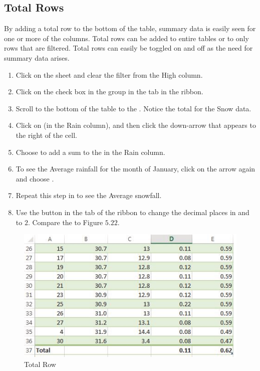 \subsection{Total Rows}

By adding a total row to the bottom of the table, summary data is easily seen for one or more of the columns. Total rows can be added to entire tables or to only rows that are filtered. Total rows can easily be toggled on and off as the need for summary data arises.

\begin{enumerate}
	\item Click on the  sheet and clear the filter from the High column.
	\item Click on the  check box in the  group in the  tab in the ribbon.
	\item Scroll to the bottom of the table to the . Notice the total for the Snow data.
	\item Click on  (in the Rain column), and then click the down-arrow that appears to the right of the cell.
	\item Choose  to add a sum to the  in the Rain column.
	\item To see the Average rainfall for the month of January, click on the arrow again and choose .
	\item Repeat this step in  to see the Average snowfall.
	\item Use the  button in the  tab of the ribbon to change the decimal places in  and  to $ 2 $. Compare the  to Figure $ 5.22 $.
\end{enumerate}
\begin{figure}[H]
	\centering
	\includegraphics[width=\maxwidth{.95\linewidth}]{gfx/ch05_fig22}
	\caption{Total Row}
	\label{05:fig22}
\end{figure}


